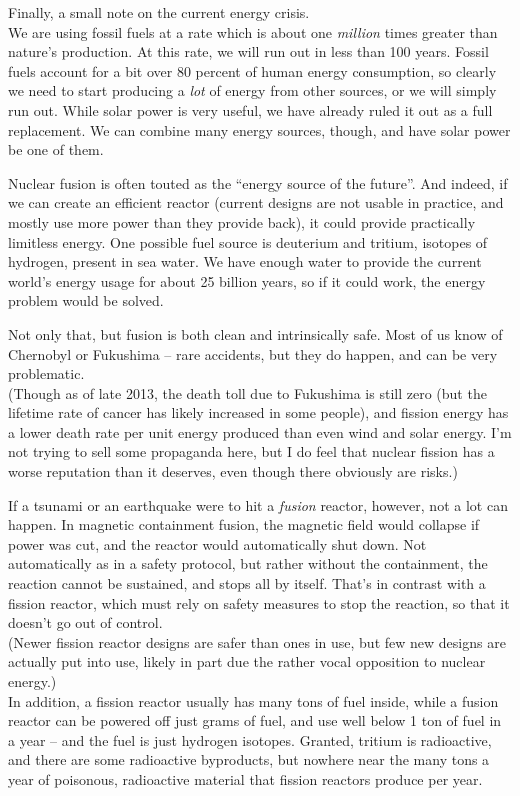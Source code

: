 \documentclass[8.01x]{subfiles}
\begin{document}
Finally, a small note on the current energy crisis.\\
We are using fossil fuels at a rate which is about one \emph{million} times greater than nature's production. At this rate, we will run out in less than 100 years. Fossil fuels account for a bit over 80 percent of human energy consumption, so clearly we need to start producing a \emph{lot} of energy from other sources, or we will simply run out. While solar power is very useful, we have already ruled it out as a full replacement. We can combine many energy sources, though, and have solar power be one of them.

Nuclear fusion is often touted as the ``energy source of the future''. And indeed, if we can create an efficient reactor (current designs are not usable in practice, and mostly use more power than they provide back), it could provide practically limitless energy. One possible fuel source is deuterium and tritium, isotopes of hydrogen, present in sea water. We have enough water to provide the current world's energy usage for about 25 billion years, so if it could work, the energy problem would be solved.

Not only that, but fusion is both clean and intrinsically safe. Most of us know of Chernobyl or Fukushima -- rare accidents, but they do happen, and can be very problematic.\\
(Though as of late 2013, the death toll due to Fukushima is still zero (but the lifetime rate of cancer has likely increased in some people), and fission energy has a lower death rate per unit energy produced than even wind and solar energy. I'm not trying to sell some propaganda here, but I do feel that nuclear fission has a worse reputation than it deserves, even though there obviously are risks.)

If a tsunami or an earthquake were to hit a \emph{fusion} reactor, however, not a lot can happen. In magnetic containment fusion, the magnetic field would collapse if power was cut, and the reactor would automatically shut down. Not automatically as in a safety protocol, but rather without the containment, the reaction cannot be sustained, and stops all by itself. That's in contrast with a fission reactor, which must rely on safety measures to stop the reaction, so that it doesn't go out of control.\\
(Newer fission reactor designs are safer than ones in use, but few new designs are actually put into use, likely in part due the rather vocal opposition to nuclear energy.)\\
In addition, a fission reactor usually has many tons of fuel inside, while a fusion reactor can be powered off just grams of fuel, and use well below 1 ton of fuel in a year -- and the fuel is just hydrogen isotopes. Granted, tritium is radioactive, and there are some radioactive byproducts, but nowhere near the many tons a year of poisonous, radioactive material that fission reactors produce per year.
\end{document}
